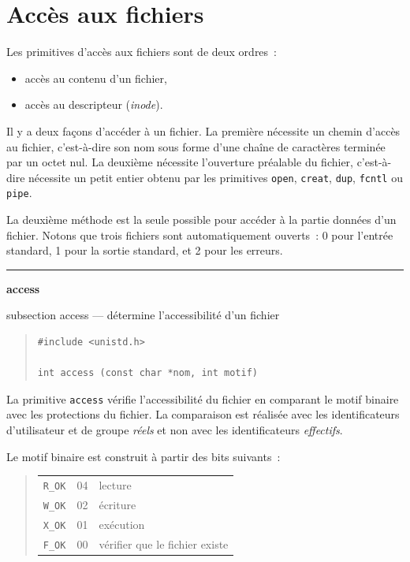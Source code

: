 \documentclass [twoside] {report}
\newcommand {\primitive} [1]
    {
	\phantomsection
	{\large \textbf {#1}}
	\addcontentsline {toc} {subsection} {#1}
    }
\newcommand {\separation}
    {
	\vspace {5mm}
	\nopagebreak
	\hrule
    }
\begin{document}
\section {Accès aux fichiers}


Les primitives d'accès aux fichiers sont de deux
ordres~:
\begin {itemize}
    \item accès au contenu d'un fichier,
    \item accès au descripteur (\textit {inode}).
\end {itemize}

Il y a deux façons d'accéder à un fichier. La première nécessite un
chemin d'accès au fichier, c'est-à-dire son nom sous forme d'une chaîne
de caractères terminée par un octet nul.  La deuxième nécessite
l'ouverture préalable du fichier, c'est-à-dire nécessite un petit
entier obtenu par les primitives \texttt {open}, \texttt {creat}, \texttt {dup},
\texttt {fcntl} ou \texttt {pipe}.

La deuxième méthode est la seule possible pour
accéder à la partie données d'un fichier. Notons
que trois fichiers sont automatiquement ouverts~:
0 pour l'entrée standard, 1 pour la sortie
standard, et 2 pour les erreurs.





\separation
\primitive {access} --- détermine l'accessibilité d'un fichier

\begin {quote}
\begin {verbatim}
#include <unistd.h>

int access (const char *nom, int motif)
\end{verbatim}
\end {quote}

La primitive \texttt {access} vérifie l'accessibilité
du fichier en comparant le motif binaire avec les
protections du fichier. La comparaison est
réalisée avec les identificateurs d'utilisateur et
de groupe \textit {réels} et non avec les identificateurs
\textit {effectifs}.

Le motif binaire est construit à partir des bits
suivants~:
\begin {quote}
    \begin {tabular} {|lll|} \hline
	\verb|R_OK| & 04 & lecture \\
	\verb|W_OK| & 02 & écriture \\
	\verb|X_OK| & 01 & exécution \\
	\verb|F_OK| & 00 & vérifier que le fichier existe \\ \hline
    \end {tabular}
\end {quote}
\end{document}
